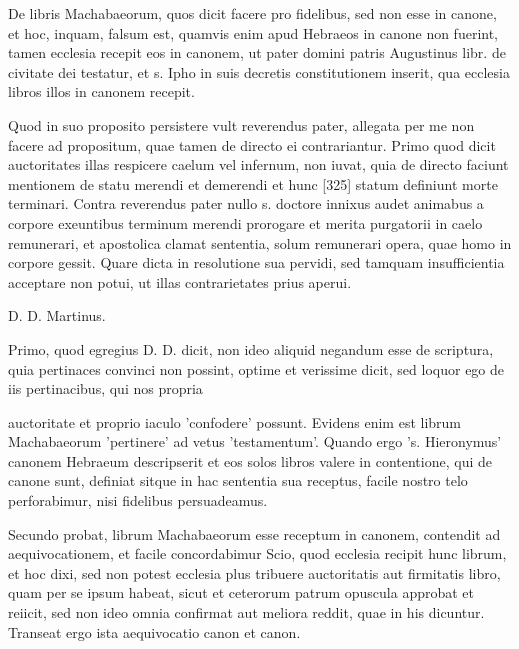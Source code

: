 De libris Machabaeorum, quos dicit facere pro fidelibus, sed non esse in canone, et hoc, inquam, falsum est, quamvis enim apud Hebraeos in canone non fuerint, tamen ecclesia recepit eos in canonem, ut pater domini patris Augustinus libr. de civitate dei testatur, et s. Ipho in suis decretis constitutionem inserit, qua ecclesia libros illos in canonem recepit.

Quod in suo proposito persistere vult reverendus pater, allegata per me non facere ad propositum, quae tamen de directo ei contrariantur. Primo quod dicit auctoritates illas respicere caelum vel infernum, non iuvat, quia de directo faciunt mentionem de statu merendi et demerendi et hunc [325] statum definiunt morte terminari. Contra reverendus pater nullo s. doctore innixus audet animabus a corpore exeuntibus terminum merendi prorogare et merita purgatorii in caelo remunerari, et apostolica clamat sententia, solum remunerari opera, quae homo in corpore gessit. Quare dicta in resolutione sua pervidi, sed tamquam insufficientia acceptare non potui, ut illas contrarietates prius aperui.

D. D. Martinus.

Primo, quod egregius D. D. dicit, non ideo aliquid negandum esse de scriptura, quia pertinaces convinci non possint, optime et verissime dicit, sed loquor ego de iis pertinacibus, qui nos propria

auctoritate et proprio iaculo 'confodere' possunt. Evidens enim est librum Machabaeorum 'pertinere' ad vetus 'testamentum'. Quando ergo 's. Hieronymus' canonem Hebraeum descripserit et eos solos libros valere in contentione, qui de canone sunt, definiat sitque in hac sententia sua receptus, facile nostro telo perforabimur, nisi fidelibus persuadeamus.

Secundo probat, librum Machabaeorum esse receptum in canonem, contendit ad aequivocationem, et facile concordabimur Scio, quod ecclesia recipit hunc librum, et hoc dixi, sed non potest ecclesia plus tribuere auctoritatis aut firmitatis libro, quam per se ipsum habeat, sicut et ceterorum patrum opuscula approbat et reiicit, sed non ideo omnia confirmat aut meliora reddit, quae in his dicuntur. Transeat ergo ista aequivocatio canon et canon.

